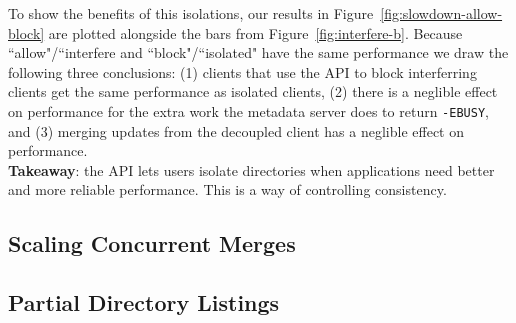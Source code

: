 To show the benefits of this isolations, our results in
Figure~\ref{fig:slowdown-allow-block} are plotted alongside the bars from
Figure~\ref{fig:interfere-b}. Because ``allow"/``interfere and
``block"/``isolated" have the same performance we draw the following three
conclusions: (1) clients that use the API to block interferring clients  get
the same performance as isolated clients, (2) there is a neglible effect on
performance for the extra work the metadata server does to return
\texttt{-EBUSY}, and (3) merging updates from the decoupled client has a
neglible effect on performance.\\

\noindent\textbf{Takeaway}: the API lets users isolate directories when
applications need better and more reliable performance. This is a way of
controlling consistency.

\subsection{Scaling Concurrent Merges}

\subsection{Partial Directory Listings}
